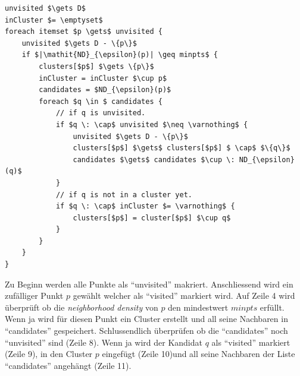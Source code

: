 
\begin{lstlisting}
unvisited $\gets D$
inCluster $= \emptyset$
foreach itemset $p \gets$ unvisited {
	unvisited $\gets D - \{p\}$
	if $|\mathit{ND}_{\epsilon}(p)| \geq minpts$ {
		clusters[$p$] $\gets \{p\}$
		inCluster = inCluster $\cup p$
		candidates = $ND_{\epsilon}(p)$
		foreach $q \in $ candidates {
			// if q is unvisited.
			if $q \: \cap$ unvisited $\neq \varnothing$ {
				unvisited $\gets D - \{p\}$
				clusters[$p$] $\gets$ clusters[$p$] $ \cap$ $\{q\}$
				candidates $\gets$ candidates $\cup \: ND_{\epsilon}(q)$
			}
			// if q is not in a cluster yet.
			if $q \: \cap$ inCluster $= \varnothing$ {
				clusters[$p$] = cluster[$p$] $\cup q$
			}
		}
	}
}
\end{lstlisting}
Zu Beginn werden alle Punkte als "`unvisited"' makriert. Anschliessend wird ein zufälliger Punkt $p$ gewählt welcher als "`visited"' markiert wird. Auf Zeile 4 wird überprüft ob die \textit{neighborhood density} von $p$ den mindestwert $minpts$ erfüllt. Wenn ja wird für diesen Punkt ein Cluster erstellt und all seine Nachbaren in "`candidates"' gespeichert. Schlussendlich überprüfen ob die "`candidates"' noch "`unvisited"' sind (Zeile 8). Wenn ja wird der Kandidat $q$ als "`visited"' markiert (Zeile 9), in den Cluster $p$ eingefügt (Zeile 10)und all seine Nachbaren der Liste "`candidates"' angehängt (Zeile 11).

